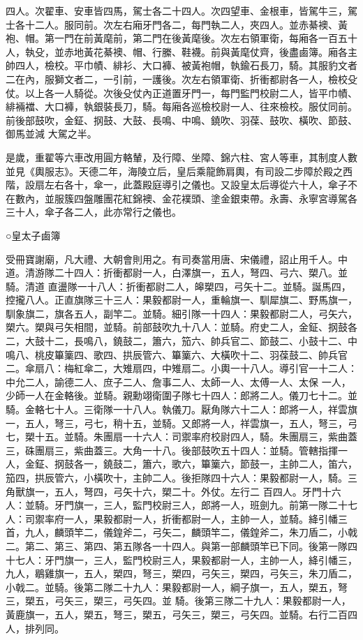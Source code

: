 \begin{pinyinscope}
 四人。次翟車、安車皆四馬，駕士各二十四人。次四望車、金根車，皆駕牛三，駕士各十二人。服同前。次左右廂牙門各二，每門執二人，夾四人。並赤綦襖、黃袍、帽。第一門在前黃麾前，第二門在後黃麾後。次左右領軍衛，每廂各一百五十人，執殳，並赤地黃花綦襖、帽、行縢、鞋襪。前與黃麾仗齊，後盡鹵簿。廂各主帥四人，檢校。平巾幘、緋衫、大口褲、被黃袍帽，執鍮石長刀，騎。其服豹文者二在內，服獅文者二，一引前，一護後。次左右領軍衛、折衝都尉各一人，檢校殳仗。以上各一人騎從。次後殳仗內正道置牙門一，每門監門校尉二人，皆平巾幘、緋裲襠、大口褲，執銀裝長刀，騎。每廂各巡檢校尉一人、往來檢校。服仗同前。前後部鼓吹，金鉦、㧏鼓、大鼓、長鳴、中鳴、鐃吹、羽葆、鼓吹、橫吹、節鼓、御馬並減
 大駕之半。



 是歲，重翟等六車改用圓方輅輦，及行障、坐障、錦六柱、宮人等車，其制度人數並見《輿服志》。天德二年，海陵立后，皇后乘龍飾肩輿，有司設二步障於殿之西階，設扇左右各十，傘一，此蓋殿庭導引之儀也。又設皇太后導從六十人，傘子不在數內，並服簇四盤雕團花紅錦襖、金花襆頭、塗金銀束帶。永壽、永寧宮導駕各三十人，傘子各二人，此亦常行之儀也。



 ○皇太子鹵簿



 受冊寶謝廟，凡大禮、大朝會則用之。有司奏當用唐、宋儀禮，詔止用千人。中道。清游隊二十四人：折衝都尉一人，白澤旗一，五人，弩四、弓六、槊八。並騎。清道
 直盪隊一十八人：折衝都尉二人，皞槊四，弓矢十二。並騎。誕馬四，控攏八人。正直旗隊三十三人：果毅都尉一人，重輪旗一、馴犀旗二、野馬旗一，馴象旗二，旗各五人，副竿二。並騎。細引隊一十四人：果毅都尉二人，弓矢六，槊六。槊與弓矢相間，並騎。前部鼓吹九十八人：並騎。府史二人，金鉦、㧏鼓各二，大鼓十二，長鳴八，鐃鼓二，簫六，笳六、帥兵官二、節鼓二、小鼓十二、中鳴八、桃皮篳篥四、歌四、拱辰管六、篳篥六、大橫吹十二、羽葆鼓二、帥兵官二。傘扇八：梅紅傘二，大雉扇四，中雉扇二。小輿一十八人。導引官一十二人：中允二人，諭德二人、庶子二人、詹事二人、太師一人、太傅一人、太保
 一人，少師一人在金輅後。並騎。親勳翊衛圍子隊七十四人：郎將二人。儀刀七十二。並騎。金輅七十人。三衛隊一十八人。執儀刀。厭角隊六十二人：郎將一人，祥雲旗一，五人，弩三，弓七，稍十五，並騎。又郎將一人，祥雲旗一，五人，弩三，弓七，槊十五。並騎。朱團扇一十六人：司禦率府校尉四人，騎。朱團扇三，紫曲蓋三，硃團扇三，紫曲蓋三。大角一十八。後部鼓吹五十四人：並騎。管轄指揮一人，金鉦、㧏鼓各一，鐃鼓二，簫六，歌六，篳篥六，節鼓一，主帥二人，笛六，笳四，拱辰管六，小橫吹十，主帥二人。後拒隊四十六人：果毅都尉一人，騎。三角獸旗一，五人，弩四，弓矢十六，槊二十。外仗。左行二
 百四人。牙門十六人：並騎。牙門旗一，三人，監門校尉三人，郎將一人，班劍九。前第一隊二十七人：司禦率府一人，果毅都尉一人，折衝都尉一人，主帥一人，並騎。絳引幡三首，九人，麟頭竿二，儀鍠斧二，弓矢二，麟頭竿二，儀鍠斧二，朱刀盾二，小戟二。第二、第三、第四、第五隊各一十四人。與第一部麟頭竿已下同。後第一隊四十七人：牙門旗一，三人，監門校尉三人，果毅都尉一人，主帥一人，絳引幡三，九人，鶡雞旗一，五人，槊四，弩三，槊四，弓矢三，槊四，弓矢三，朱刀盾二，小戟二。並騎。後第二隊二十九人：果毅都尉一人，綱子旗一，五人，槊五，弩三，槊五，弓矢三，槊三，弓矢四。並
 騎。後第三隊二十九人：果毅都尉一人，黃鹿旗一，五人，槊五，弩三，槊五，弓矢三，槊三，弓矢四。並騎。右行二百四人，排列同。




\end{pinyinscope}
